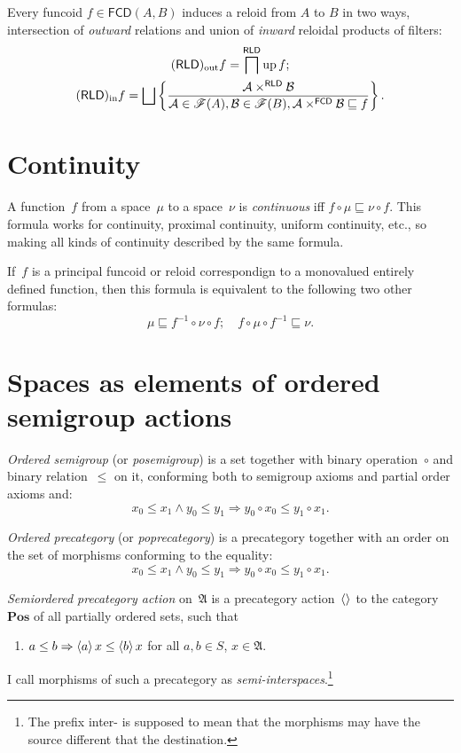 \documentclass{amsart}
\begin{document}
Every funcoid $f\in\mathsf{FCD}(A,B)$
induces a reloid from $A$ to $B$ in two ways, intersection of \emph{outward}
relations and union of \emph{inward} reloidal products of filters:
\begin{gather*}
\torldout f=\bigsqcap^{\mathsf{RLD}}\up f;\\
\torldin f=\bigsqcup\setcond{\mathcal{A}\times^{\mathsf{RLD}}\mathcal{B}}{\mathcal{A}\in\mathscr{F}(A),\mathcal{B}\in\mathscr{F}(B),\mathcal{A}\times^{\mathsf{FCD}}\mathcal{B}\sqsubseteq f}.
\end{gather*}

\section{Continuity}

A function~$f$ from a space~$\mu$ to a space~$\nu$ is \emph{continuous} iff
$f\circ\mu\sqsubseteq \nu\circ f$. This formula works for continuity, proximal continuity,
uniform continuity, etc., so making all kinds of continuity described by the same formula.

If~$f$ is a principal funcoid or reloid correspondign to a monovalued entirely defined function, then this formula is
equivalent to the following two other formulas:
\[ \mu\sqsubseteq f^{-1}\circ\nu\circ f;\quad
f\circ\mu\circ f^{-1}\sqsubseteq \nu. \]

\section{Spaces as elements of ordered semigroup actions}

\begin{defn}
\emph{Ordered semigroup} (or \emph{posemigroup}) is a set together with binary operation~$\circ$ and binary relation~$\leq$ on it, conforming both to semigroup axioms and partial order axioms and:
\[ x_0\leq x_1\land y_0\leq y_1\Rightarrow y_0\circ x_0\leq y_1\circ x_1. \]
\end{defn}

\begin{defn}
\emph{Ordered precategory} (or \emph{poprecategory}) is
a precategory together with an order on the set of morphisms conforming to the equality:
\[ x_0\leq x_1\land y_0\leq y_1\Rightarrow y_0\circ x_0\leq y_1\circ x_1. \]
\end{defn}

\begin{defn}
\emph{Semiordered precategory action} on~$\mathfrak{A}$ is a precategory action~$\left\langle \right\rangle$ to the category~$\mathbf{Pos}$ of all partially ordered sets, such that
\begin{enumerate}
\item $a\leq b\Rightarrow\left\langle a\right\rangle x\leq \left\langle b\right\rangle x$ for all $a,b\in S$, $x\in\mathfrak{A}$.
\end{enumerate}
I call morphisms of such a precategory as \emph{semi-interspaces}.\footnote{The prefix inter- is supposed to mean that the morphisms may have the source different that the destination.}
\end{defn}
\end{document}
